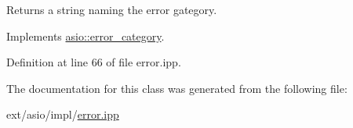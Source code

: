Returns a string naming the error gategory. 



Implements \hyperlink{classasio_1_1error__category_a556b6099e1cc2d1cfb22e4ef2c9b0947}{asio\+::error\+\_\+category}.



Definition at line 66 of file error.\+ipp.



The documentation for this class was generated from the following file\+:\begin{DoxyCompactItemize}
\item 
ext/asio/impl/\hyperlink{impl_2error_8ipp}{error.\+ipp}\end{DoxyCompactItemize}
